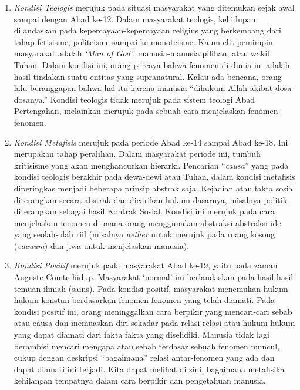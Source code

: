 \documentclass[11pt,twoside,a5paper,openany]{memoir}
\def\tightlist{}
\begin{document}
\begin{enumerate}
\def\labelenumi{\arabic{enumi}.}
\tightlist
\item
  \emph{Kondisi Teologis} merujuk pada situasi masyarakat yang ditemukan
  sejak awal sampai dengan Abad ke-12. Dalam masyarakat teologis,
  kehidupan dilandaskan pada kepercayaan-kepercayaan religius yang
  berkembang dari tahap fetisisme, politeisme sampai ke monoteisme. Kaum
  elit pemimpin masyarakat adalah \emph{`Man of God'}, manusia-manusia
  pilihan, atau wakil Tuhan. Dalam kondisi ini, orang percaya bahwa
  fenomen di dunia ini adalah hasil tindakan suatu entitas yang
  supranatural. Kalau ada bencana, orang lalu beranggapan bahwa hal itu
  karena manusia ``dihukum Allah akibat dosa-dosanya.'' Kondisi teologis
  tidak merujuk pada sistem teologi Abad Pertengahan, melainkan merujuk
  pada sebuah cara menjelaskan fenomen-fenomen.
\item
  \emph{Kondisi Metafisis} merujuk pada periode Abad ke-14 sampai Abad
  ke-18. Ini merupakan tahap peralihan. Dalam masyarakat periode ini,
  tumbuh kritisisme yang akan menghancurkan hierarki. Pencarian
  ``\emph{causa}'' yang pada kondisi teologis berakhir pada dewa-dewi
  atau Tuhan, dalam kondisi metafisis diperingkas menjadi beberapa
  prinsip abstrak saja. Kejadian atau fakta sosial diterangkan secara
  abstrak dan dicarikan hukum dasarnya, misalnya politik diterangkan
  sebagai hasil Kontrak Sosial. Kondisi ini merujuk pada cara
  menjelaskan fenomen di mana orang menggunakan abstraksi-abstraksi ide
  yang seolah-olah riil (misalnya \emph{aether} untuk merujuk pada ruang
  kosong (\emph{vacuum}) dan jiwa untuk menjelaskan manusia).
\item
  \emph{Kondisi Positif} merujuk pada masyarakat Abad ke-19, yaitu pada
  zaman Auguste Comte hidup. Masyarakat `normal' ini berlandaskan pada
  hasil-hasil temuan ilmiah (sains). Pada kondisi positif, masyarakat
  menemukan hukum-hukum konstan berdasarkan fenomen-fenomen yang telah
  diamati. Pada kondisi positif ini, orang meninggalkan cara berpikir
  yang mencari-cari sebab atau causa dan memuaskan diri sekadar pada
  relasi-relasi atau hukum-hukum yang dapat diamati dari fakta fakta
  yang diselidiki. Manusia tidak lagi berambisi mencari mengapa atau
  sebab terdasar sebuah fenomen muncul, cukup dengan deskripsi
  ``bagaimana'' relasi antar-fenomen yang ada dan dapat diamati ini
  terjadi. Kita dapat melihat di sini, bagaimana metafisika kehilangan
  tempatnya dalam cara berpikir dan pengetahuan manusia.
\end{enumerate}
\end{document}
